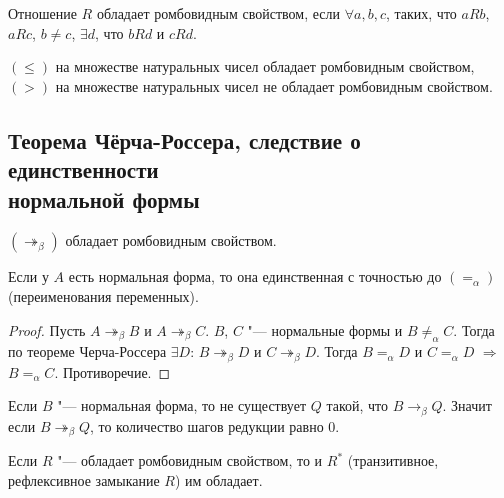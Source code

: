 \begin{definition}
	Отношение $R$ обладает ромбовидным свойством, если $\forall a,b,c$, таких, что $aRb$, $aRc$, $b\neq{}c$, $\exists{}d$, что $bRd$ и $cRd$.
\end{definition}

\begin{example}
	$(\leq)$ на множестве натуральных чисел обладает ромбовидным свойством,
	$(>)$ на множестве натуральных чисел не обладает ромбовидным свойством.
\end{example}

\subsection{Теорема Чёрча-Россера, следствие о единственности \\нормальной формы}

\begin{theorem}
	$(\twoheadrightarrow_{\beta})$ обладает ромбовидным свойством.
\end{theorem}


\begin{cons}
	Если у $A$ есть нормальная форма, то она единственная с точностью до $(=_{\alpha})$ (переименования переменных).
\end{cons}

\begin{proof}
	Пусть $A\twoheadrightarrow_{\beta}B$ и $A\twoheadrightarrow_{\beta}C$. $B$, $C$ "--- нормальные формы и $B\neq_{\alpha}C$. 
	Тогда по теореме Черча-Россера $\exists{}D$: $B\twoheadrightarrow_{\beta}D$ и $C\twoheadrightarrow_{\beta}D$. Тогда $B=_{\alpha}D$ и $C=_{\alpha} D$ $\Rightarrow$ $B=_{\alpha}C$. Противоречие.
\end{proof}

\begin{lemma}
	Если $B$ "--- нормальная форма, то не существует $Q$ такой, что $B\to_{\beta}Q$. Значит если $B\twoheadrightarrow_{\beta}Q$, то количество шагов редукции равно 0.
\end{lemma}

\begin{lemma}
	 \label{refl}
	Если $R$ "--- обладает ромбовидным свойством, то и $R^{*}$ (транзитивное, рефлексивное замыкание $R$) им обладает.
\end{lemma}

